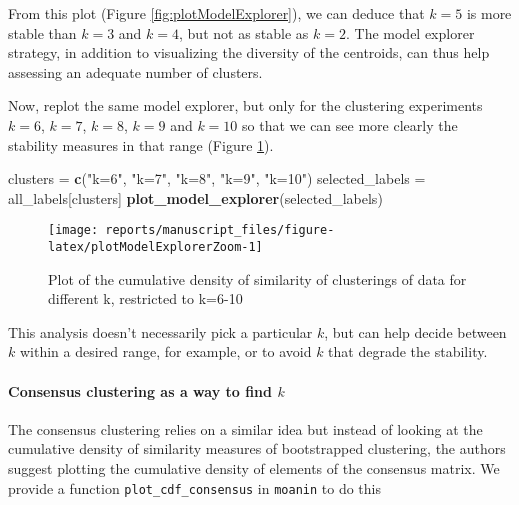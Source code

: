 \documentclass[9pt,a4paper,]{extarticle}
\newenvironment{Shaded}{\begin{snugshade}}{\end{snugshade}}
\newcommand{\KeywordTok}[1]{\textcolor[rgb]{0.13,0.29,0.53}{\textbf{#1}}}
\newcommand{\NormalTok}[1]{#1}
\newcommand{\StringTok}[1]{\textcolor[rgb]{0.31,0.60,0.02}{#1}}
\begin{document}
From this plot (Figure \ref{fig:plotModelExplorer}), we can deduce that \(k=5\)
is more stable than \(k=3\) and \(k=4\), but not as stable as \(k=2\). The model
explorer strategy, in addition to visualizing the diversity of the centroids,
can thus help assessing an adequate number of clusters.

Now, replot the same model explorer, but only for the clustering experiments
\(k=6\), \(k=7\), \(k=8\), \(k=9\) and \(k=10\) so that we can see more clearly the stability
measures in that range (Figure \ref{fig:plotModelExplorerZoom}).

\begin{Shaded}
\begin{Highlighting}[]
\NormalTok{clusters =}\StringTok{ }\KeywordTok{c}\NormalTok{(}\StringTok{"k=6"}\NormalTok{, }\StringTok{"k=7"}\NormalTok{, }\StringTok{"k=8"}\NormalTok{, }\StringTok{"k=9"}\NormalTok{, }\StringTok{"k=10"}\NormalTok{)}
\NormalTok{selected_labels =}\StringTok{ }\NormalTok{all_labels[clusters]}
\KeywordTok{plot_model_explorer}\NormalTok{(selected_labels)}
\end{Highlighting}
\end{Shaded}

\begin{figure}[H]

{\centering \texttt{[image: reports/manuscript\_files/figure-latex/plotModelExplorerZoom-1]} 

}

\caption{Plot of the cumulative density of similarity of clusterings of data for different k, restricted to k=6-10}\label{fig:plotModelExplorerZoom}
\end{figure}

This analysis doesn't necessarily pick a particular \(k\), but can help decide
between \(k\) within a desired range, for example, or to avoid \(k\) that degrade
the stability.

\hypertarget{consensus-clustering-as-a-way-to-find-k}{%
\paragraph{\texorpdfstring{Consensus clustering as a way to find \(k\)}{Consensus clustering as a way to find k}}\label{consensus-clustering-as-a-way-to-find-k}}

The consensus clustering \citep{monti:consensus} relies on a similar idea but
instead of looking at the cumulative density of similarity measures of
bootstrapped clustering, the authors suggest plotting the cumulative density
of elements of the consensus matrix. We provide a function
\texttt{plot\_cdf\_consensus} in \texttt{moanin} to do this
\end{document}
